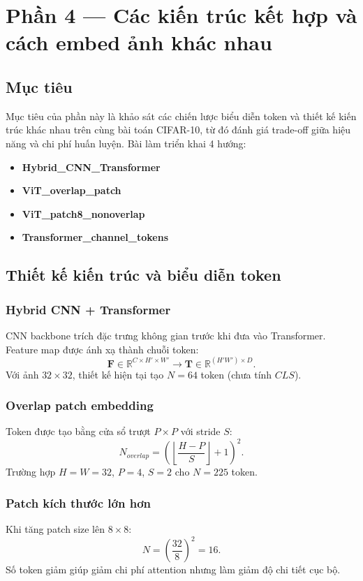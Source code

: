 \section{Phần 4 --- Các kiến trúc kết hợp và cách embed ảnh khác nhau}

\subsection{Mục tiêu}
Mục tiêu của phần này là khảo sát các chiến lược biểu diễn token và thiết kế kiến trúc khác nhau trên cùng bài toán CIFAR-10, từ đó đánh giá trade-off giữa hiệu năng và chi phí huấn luyện. Bài làm triển khai 4 hướng:
\begin{itemize}
    \item \textbf{Hybrid\_CNN\_Transformer}
    \item \textbf{ViT\_overlap\_patch}
    \item \textbf{ViT\_patch8\_nonoverlap}
    \item \textbf{Transformer\_channel\_tokens}
\end{itemize}

\subsection{Thiết kế kiến trúc và biểu diễn token}

\subsubsection{Hybrid CNN + Transformer}
CNN backbone trích đặc trưng không gian trước khi đưa vào Transformer. Feature map được ánh xạ thành chuỗi token:
\[
\mathbf{F}\in\mathbb{R}^{C\times H'\times W'}
\rightarrow
\mathbf{T}\in\mathbb{R}^{(H'W')\times D}.
\]
Với ảnh \(32\times32\), thiết kế hiện tại tạo \(N=64\) token (chưa tính \(CLS\)).

\subsubsection{Overlap patch embedding}
Token được tạo bằng cửa sổ trượt \(P\times P\) với stride \(S\):
\[
N_{overlap}=\left(\left\lfloor\frac{H-P}{S}\right\rfloor+1\right)^2.
\]
Trường hợp \(H=W=32\), \(P=4\), \(S=2\) cho \(N=225\) token.

\subsubsection{Patch kích thước lớn hơn}
Khi tăng patch size lên \(8\times8\):
\[
N = \left(\frac{32}{8}\right)^2 = 16.
\]
Số token giảm giúp giảm chi phí attention nhưng làm giảm độ chi tiết cục bộ.

